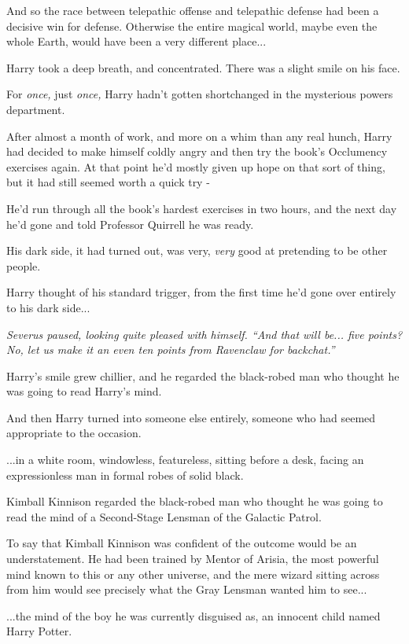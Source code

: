 And so the race between telepathic offense and telepathic defense had
been a decisive win for defense. Otherwise the entire magical world,
maybe even the whole Earth, would have been a very different
place...

Harry took a deep breath, and concentrated. There was a slight smile on
his face.

For \emph{once,} just \emph{once,} Harry hadn't gotten shortchanged in
the mysterious powers department.

After almost a month of work, and more on a whim than any real hunch,
Harry had decided to make himself coldly angry and then try the book's
Occlumency exercises again. At that point he'd mostly given up hope on
that sort of thing, but it had still seemed worth a quick try -

He'd run through all the book's hardest exercises in two hours, and the
next day he'd gone and told Professor Quirrell he was ready.

His dark side, it had turned out, was very, \emph{very} good at
pretending to be other people.

Harry thought of his standard trigger, from the first time he'd gone
over entirely to his dark side...

\emph{Severus paused, looking quite pleased with himself. ``And that
will be... five points? No, let us make it an even ten points from
Ravenclaw for backchat.''}

Harry's smile grew chillier, and he regarded the black-robed man who
thought he was going to read Harry's mind.

And then Harry turned into someone else entirely, someone who had seemed
appropriate to the occasion.

...in a white room, windowless, featureless, sitting before a desk,
facing an expressionless man in formal robes of solid black.

Kimball Kinnison regarded the black-robed man who thought he was going
to read the mind of a Second-Stage Lensman of the Galactic Patrol.

To say that Kimball Kinnison was confident of the outcome would be an
understatement. He had been trained by Mentor of Arisia, the most
powerful mind known to this or any other universe, and the mere wizard
sitting across from him would see precisely what the Gray Lensman wanted
him to see...

...the mind of the boy he was currently disguised as, an innocent
child named Harry Potter.

